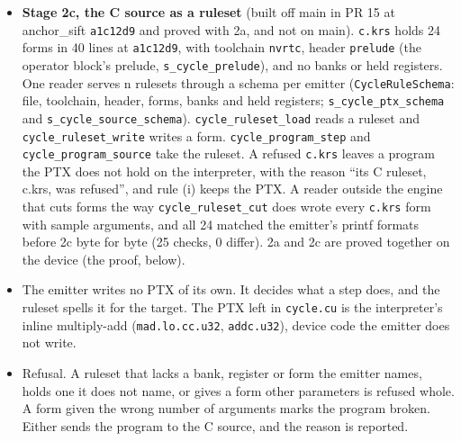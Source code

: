 \begin{enumerate}
\begin{itemize}
\begin{enumerate}
\begin{itemize}
\begin{itemize}
\item \textbf{Stage 2c, the C source as a ruleset} (built off main in PR 15 at anchor\_\allowbreak{}sift \texttt{a1c12d9} and proved with 2a, and not on main). \texttt{c.\allowbreak{}krs} holds 24 forms in 40 lines at \texttt{a1c12d9}, with toolchain \texttt{nvrtc}, header \texttt{prelude} (the operator block's prelude, \texttt{s\_\allowbreak{}cycle\_\allowbreak{}prelude}), and no banks or held registers. One reader serves n rulesets through a schema per emitter (\texttt{CycleRuleSchema}: file, toolchain, header, forms, banks and held registers; \texttt{s\_\allowbreak{}cycle\_\allowbreak{}ptx\_\allowbreak{}schema} and \texttt{s\_\allowbreak{}cycle\_\allowbreak{}source\_\allowbreak{}schema}). \texttt{cycle\_\allowbreak{}ruleset\_\allowbreak{}load} reads a ruleset and \texttt{cycle\_\allowbreak{}ruleset\_\allowbreak{}write} writes a form. \texttt{cycle\_\allowbreak{}program\_\allowbreak{}step} and \texttt{cycle\_\allowbreak{}program\_\allowbreak{}source} take the ruleset. A refused \texttt{c.\allowbreak{}krs} leaves a program the PTX does not hold on the interpreter, with the reason “its C ruleset, c.krs, was refused”, and rule (i) keeps the PTX. A reader outside the engine that cuts forms the way \texttt{cycle\_\allowbreak{}ruleset\_\allowbreak{}cut} does wrote every \texttt{c.\allowbreak{}krs} form with sample arguments, and all 24 matched the emitter's printf formats before 2c byte for byte (25 checks, 0 differ). 2a and 2c are proved together on the device (the proof, below).
\item The emitter writes no PTX of its own. It decides what a step does, and the ruleset spells it for the target. The PTX left in \texttt{cycle.\allowbreak{}cu} is the interpreter's inline multiply-add (\texttt{mad.lo.cc.u32}, \texttt{addc.u32}), device code the emitter does not write.
\item Refusal. A ruleset that lacks a bank, register or form the emitter names, holds one it does not name, or gives a form other parameters is refused whole. A form given the wrong number of arguments marks the program broken. Either sends the program to the C source, and the reason is reported.

\end{itemize}
\end{itemize}
\end{enumerate}
\end{itemize}
\end{enumerate}
